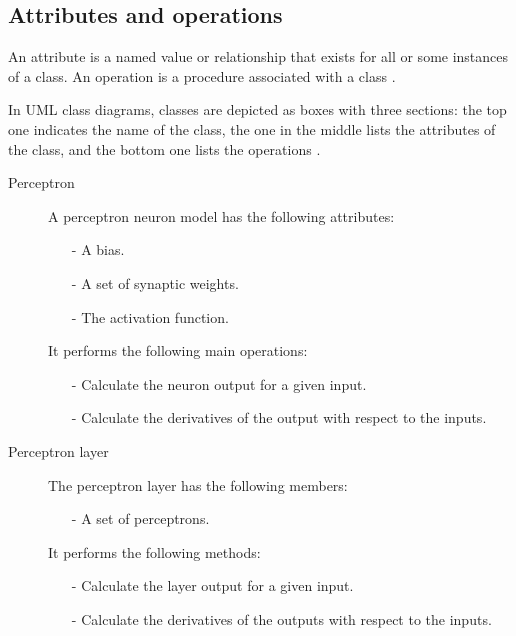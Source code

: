 \subsection*{Attributes and operations}

An attribute is a named value or relationship that exists for all
or some instances of a class. An operation is a procedure
associated with a class \cite{Stroustrup2000}. 

In UML class
diagrams, classes are depicted as boxes with three sections: the
top one indicates the name of the class, the one in the middle
lists the attributes of the class, and the bottom one lists the
operations \cite{Rumbaugh1999}.


\begin{description}

\item[Perceptron] A perceptron neuron model has the following attributes:

\begin{itemize}
\item[-] A bias.
\item[-] A set of synaptic weights.
\item[-] The activation function.
\end{itemize}

It performs the following main operations:

\begin{itemize}
\item[-] Calculate the neuron output for a given input.
\item[-] Calculate the derivatives of the output with respect to the inputs.
\end{itemize}


\item[Perceptron layer] The perceptron layer has the following members:

\begin{itemize}
\item[-] A set of perceptrons.
\end{itemize}
 
It performs the following methods:

\begin{itemize}
\item[-] Calculate the layer output for a given input.
\item[-] Calculate the derivatives of the outputs with respect to the inputs.
\end{itemize}


\end{description}
